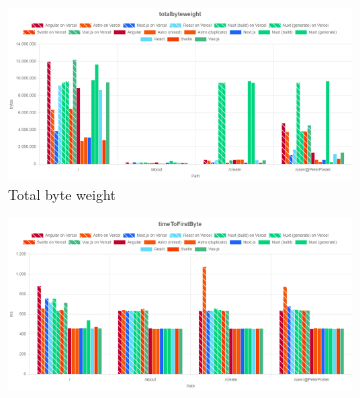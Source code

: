 \documentclass[a4paper, 10pt]{article}
\begin{document}
\begin{figure}[ht!]
  \centering
  \begin{subfigure}{0.95\linewidth}
    \begin{center}
      \includegraphics[width=\linewidth, keepaspectratio]{img/lighthouse-results/TBW.png}
    \end{center}
    \caption{Total byte weight}\label{subfig:LH:totalbyteweight}
  \end{subfigure}
  \begin{subfigure}{0.95\linewidth}
    \begin{center}
      \includegraphics[width=\linewidth, keepaspectratio]{img/lighthouse-results/TTFB.png}

\end{center}
\end{subfigure}
\end{figure}
\end{document}
